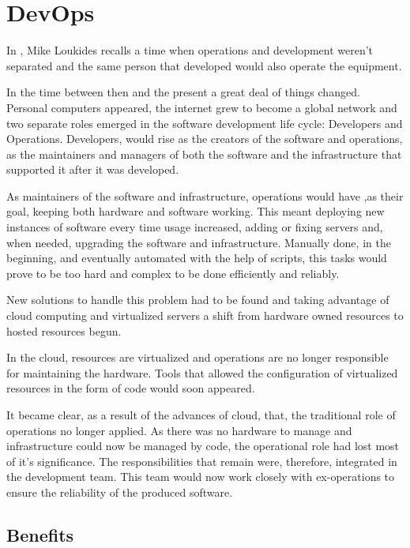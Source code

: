 	\section{DevOps}\label{sec:stateArtDevops}
		
        In  \cite{Loukides2012}, Mike Loukides recalls a time when operations and development weren't separated and the same person that developed would also operate the equipment.  
        
        In the time between then and the present a great deal of things changed. Personal computers appeared, the internet grew to become a global network and two separate roles emerged in the software development life cycle: Developers and Operations. Developers, would rise as the creators of the software and operations, as the maintainers and managers of both the software and the infrastructure that supported it after it was developed.
        
        As maintainers of the software and infrastructure, operations would have ,as their goal, keeping both hardware and software working. This meant deploying new instances of software every time usage increased, adding or fixing servers and, when needed, upgrading the software and infrastructure. Manually done, in the beginning, and eventually automated with the help of scripts, this tasks would prove to be too hard and complex to be done efficiently and reliably. 
        
        New solutions to handle this problem had to be found and taking advantage of cloud computing and virtualized servers a shift from hardware owned resources to hosted resources begun.
        
        In the cloud, resources are virtualized and operations are no longer responsible for maintaining the hardware. Tools that allowed the configuration of virtualized resources in the form of code would soon appeared.
        
        	It became clear, as a result of the advances of cloud, that, the traditional role of operations no longer applied. As there was no hardware to manage and infrastructure could now be managed by code, the operational role had lost most of it's significance. The responsibilities that remain were, therefore, integrated in the development team. This team would now work closely with ex-operations to ensure the reliability of the produced software.   
	
      \subsection{Benefits}
      
